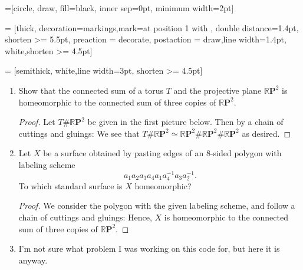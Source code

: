 \documentclass{article}
\begin{document}




=[circle, draw, fill=black,
                        inner sep=0pt, minimum width=2pt]

 = [thick, decoration={markings,mark=at position
   1 with {}},
   double distance=1.4pt, shorten >= 5.5pt,
   preaction = {decorate},
   postaction = {draw,line width=1.4pt, white,shorten >= 4.5pt}]

 = [semithick, white,line width=3pt, shorten >= 4.5pt]











\begin{enumerate}
\item Show that the connected sum of a torus $T$ and the projective plane $\mathbb{R}\mathbf{P}^{2}$ is homeomorphic to the connected sum of three copies of $\mathbb{R}\mathbf{P}^2$.
\begin{proof}
Let $T \# \mathbb{R}\mathbf{P}^{2}$ be given in the first picture below. Then by a chain of cuttings and gluings:
%
We see that $T \# \mathbb{R}\mathbf{P}^{2} \simeq \mathbb{R}\mathbf{P}^{2} \# \mathbb{R}\mathbf{P}^{2}\# \mathbb{R}\mathbf{P}^{2}$ as desired.
\end{proof}


\item Let $X$ be a surface obtained by pasting edges of an $8$-sided polygon with labeling scheme
\[
a_1a_2a_3a_4a_1a_4^{-1}a_3a_2^{-1}.
\] 
To which standard surface is $X$ homeomorphic?

\begin{proof}
 We consider the polygon with the given labeling scheme, and follow a chain of cuttings and gluings:
%
Hence, $X$ is homeomorphic to the connected sum of three copies of $\mathbb{R}\mathbf{P}^{2}$.

\end{proof}


\item I'm not sure what problem I was working on this code for, but here it is anyway.
%


\end{enumerate}
\end{document}
